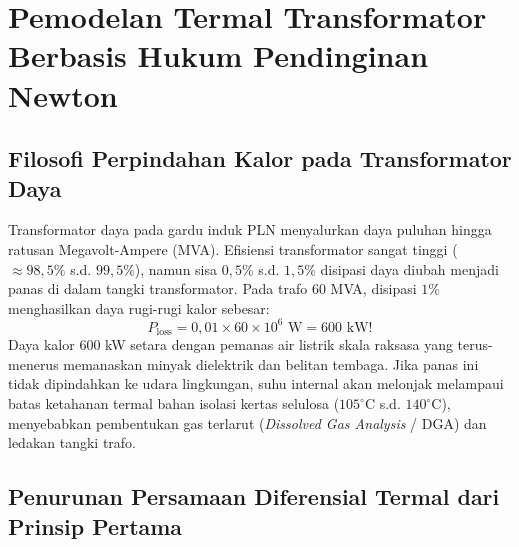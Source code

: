 \documentclass[11pt,a4paper]{article}
\theoremstyle{definition}
\begin{document}
\section{Pemodelan Termal Transformator Berbasis Hukum Pendinginan Newton}

\subsection{Filosofi Perpindahan Kalor pada Transformator Daya}

Transformator daya pada gardu induk PLN menyalurkan daya puluhan hingga ratusan Megavolt-Ampere (MVA). Efisiensi transformator sangat tinggi ($\approx 98{,}5\%$ s.d. $99{,}5\%$), namun sisa $0{,}5\%$ s.d. $1{,}5\%$ disipasi daya diubah menjadi panas di dalam tangki transformator. Pada trafo 60 MVA, disipasi $1\%$ menghasilkan daya rugi-rugi kalor sebesar:
\begin{equation}
    P_{\text{loss}} = 0{,}01 \times 60 \times 10^6\text{ W} = 600\text{ kW!}
\end{equation}
Daya kalor 600 kW setara dengan pemanas air listrik skala raksasa yang terus-menerus memanaskan minyak dielektrik dan belitan tembaga. Jika panas ini tidak dipindahkan ke udara lingkungan, suhu internal akan melonjak melampaui batas ketahanan termal bahan isolasi kertas selulosa ($105^\circ\text{C}$ s.d. $140^\circ\text{C}$), menyebabkan pembentukan gas terlarut (\textit{Dissolved Gas Analysis} / DGA) dan ledakan tangki trafo.

\subsection{Penurunan Persamaan Diferensial Termal dari Prinsip Pertama}
\end{document}
